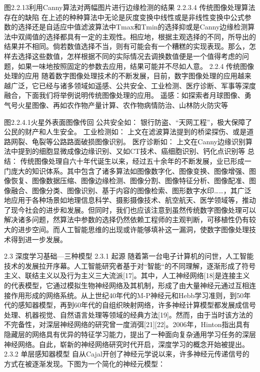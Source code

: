 图2.2.13利用Canny算法对两幅图片进行边缘检测的结果
2.2.3.4 传统图像处理算法存在的缺陷
	在上述的种种算法中无论是灰度变换中线性或是非线性变换中公式参数的选择还是自适应中值滤波算法中Tmax和Tmin的选择抑或是Canny边缘检测算法中双阈值的选择都具有一定的主观性。相应地，根据主观选择的不同，所导出的结果并不相同。倘若数值选择不当，则有可能会有一个糟糕的实现表现。那么，怎样去选择这些数值，怎样根据不同的实际情况去调换数值便是一个值得考虑的问题，如果一味地按照固定的参数去应用，结果可能并不尽如人意。
2.2.4 传统图像处理的应用
	随着数字图像处理技术的不断发展，目前，数字图像处理的应用越来越广泛，它已经与诸多领域如遥感、公共安全、工业检测、医疗诊断、军事等深度融合，下面我们将举例说明传统图像处理的应用。
	遥感：如探索者月球图像、勇气号火星图像、再如农作物产量计算、农作物病情防治、山林防火防灾等

图2.2.4.1火星外表面图像传回
	公共安全如：
银行防盗、“天网工程”，极大保障了公民的财产和人生安全。
	工业检测如：
上文在滤波算法提到的桥梁探伤、或是道路网裂、龟裂等公路路面破损图像识别。	
	医疗诊断如：
上文在Canny边缘识别算法中提到的细胞显微成像边缘识别、又如CT技术、癌细胞识别、钙化点识别等
总结：
	传统图像处理自六十年代诞生以来，经过五十余年的不断发展，业已形成一门庞大的知识体系。其中包含了诸多算法如图像数字化、图像变换、图像增强、图像恢复、图像数据压缩、图像边缘检测、图像分割、图像特征分析、图像配准、图像融合、图像分类、图像识别、基于内容的图像检索、图形数字水印……，其广泛地应用于各种场景如地理信息科学、摄影摄像技术、航空航天、医学领域等，推动了现今社会的进步和发展。但同时，我们也应该注意到虽然传统数字图像处理可以解决诸多问题，然算法中参数的选择仍然依赖工程师的主观判断，可移植性仍有较大的进步空间。而人工智能思维的出现或许能够填补这一漏洞，使数字图像处理技术得到进一步发展。

2.3 深度学习基础---三种模型
2.3.1 起源
随着第一台电子计算机的问世，人工智能技术的发展拉开序幕。人工智能研究者基于对“智能“的不同理解，逐渐形成了符号主义、联结主义以及行为主义三大流派[17]。其中，人工神经网络[18]是连接主义的代表模型，它通过模拟生物神经网络及其机制，形成了由大量神经元通过互相连接作用形成的网络系统。从上世纪40年代的M-P神经元和Hebb学习准则，到50年代的感知器模型，再到60年代的自组织映射网络，许多神经计算模型都发展成信号处理、机器视觉、自然语言处理等领域的经典方法[19]。然而，由于当时该方法的不完备性，对深层神经网络的研究曾一度消弭[21][22]。2006年，Hinton指出具有隐藏层的网络具有优异的特征学习能力，提出了一种面向复杂通用学习任务的深层神经网络。自此，崭新的神经网络研究时代开启，深度学习的概念开始被提出。
 2.3.2 单层感知器模型
自从Cajal开创了神经元学说以来，许多神经元传递信号的方式在被逐渐发现。下图为一个简化的神经元模型：

